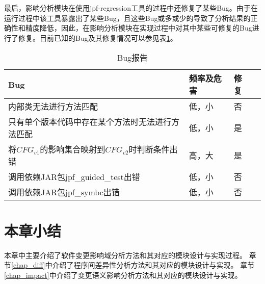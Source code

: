 最后，影响分析模块在使用jpf-regression工具的过程中还修复了某些Bug。由于在运行过程中该工具暴露出了某些Bug，且这些Bug或多或少的导致了分析结果的正确性和精度降低，因此，在影响分析模块在实现过程中对其中某些可修复的Bug进行了修复。目前已知的Bug及其修复情况可以参见表\ref {bug_data}。
\begin{table}[H]
	\caption{Bug报告}
	\label{bug_data}
	\centering
	\begin{tabular}{lllc}
		\toprule[1.5pt]
		{\heiti Bug} &{\heiti 频率及危害} & {\heiti 修复} \\\midrule[1pt]
		内部类无法进行方法匹配 & 低，小 & 否\\
		只有单个版本代码中存在某个方法时无法进行方法匹配 & 低，小 & 是\\
		将$CFG_{v1}$的影响集合映射到$CFG_{v2}$时判断条件出错 & 高，大 & 是\\
		调用依赖JAR包jpf\_guided\_test出错 & 低，小 & 否\\
		调用依赖JAR包jpf\_symbc出错 & 低，小 & 否\\
		\bottomrule[1.5pt]
	\end{tabular}
\end{table}

\section{本章小结}

本章中主要介绍了软件变更影响域分析方法和其对应的模块设计与实现过程。
章节\ref {chap_diff}中介绍了程序间差异性分析方法和其对应的模块设计与实现。
章节\ref {chap_impact}中介绍了变更语义影响分析方法和其对应的模块设计与实现。
